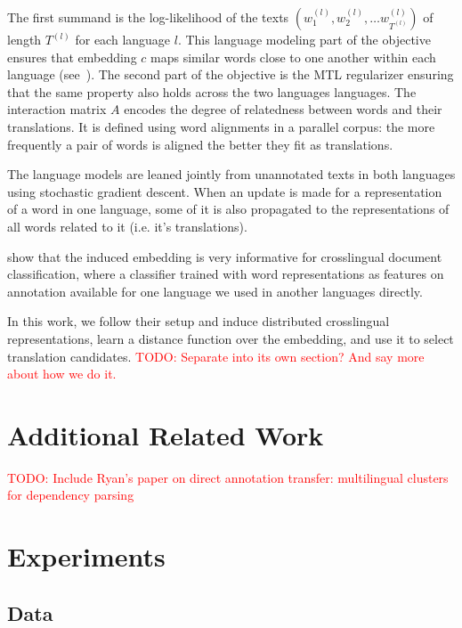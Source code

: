 \documentclass[11pt,letterpaper]{article}
\newcommand{\todo}[1]{\textcolor{red}{TODO: #1}}
\begin{document}
The first summand is the log-likelihood of the texts $(w_1^{(l)}, w_2^{(l)}, \dots w_{T^{(l)}}^{(l)})$ of length $T^{(l)}$ for each language $l$.  This language modeling part of the objective ensures that embedding $c$ maps similar words close to one another within each language (see~).  The second part of the objective is the MTL regularizer ensuring that the same property also holds across the two languages languages.  
The interaction matrix $A$ encodes the degree of relatedness between words and their translations.   
It is defined using word alignments in a parallel corpus: the more frequently a pair of words is aligned the better they fit as translations.

The language models are leaned jointly from unannotated texts in both languages using stochastic gradient descent.  When an update is made for a representation of a word in one language, some of it is also propagated to the representations of all words related to it (i.e. it's translations).

 show that the induced embedding is very informative for crosslingual document classification, where a classifier trained with word representations as features on annotation available for one language we used in another languages directly.  

In this work, we follow their setup and induce distributed crosslingual representations, learn a distance function over the embedding, and use it to select translation candidates. \todo{Separate into its own section?  And say more about how we do it.}

\section{Additional Related Work} \label{sect:rework}

\todo{Include Ryan's paper on direct annotation transfer: multilingual clusters for dependency parsing}

\section{Experiments} \label{sect:experiments}

\subsection{Data}
\end{document}
